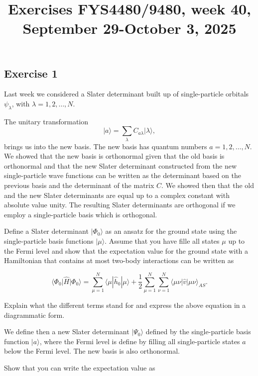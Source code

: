 \documentclass[prc]{revtex4}
\begin{document}
\title{Exercises FYS4480/9480, week 40, September 29-October 3, 2025}
\maketitle



\subsection*{Exercise 1}

Last week we considered a Slater determinant built up of
single-particle orbitals $\psi_{\lambda}$, with $\lambda =
1,2,\dots,N$.

The unitary transformation
\[
\vert a\rangle  = \sum_{\lambda} C_{a\lambda}\vert \lambda\rangle,
\]
brings us into the new basis.  The new basis has quantum numbers
$a=1,2,\dots,N$.  We showed that the new basis is orthonormal given
that the old basis is orthonormal and that the new Slater determinant
constructed from the new single-particle wave functions can be written
as the determinant based on the previous basis and the determinant of
the matrix $C$.  We showed then that the old and the new Slater
determinants are equal up to a complex constant with absolute value
unity.  The resulting Slater determinants are orthogonal if we employ
a single-particle basis which is orthogonal.

Define a Slater determinant $\vert\Phi_0\rangle$ as an ansatz for the ground state
using the single-particle basis functions $\vert\mu\rangle$.  Assume
that you have fille all states $\mu$ up to the Fermi level and show
that the expectation value for the ground state with a Hamiltonian
that contains at most two-body interactions can be written as

\[
 \langle \Phi_0 \vert \hat{H}\vert \Phi_0\rangle 
  = \sum_{\mu=1}^N \langle \mu | \hat{h}_0 | \mu \rangle +
  \frac{1}{2}\sum_{{\mu}=1}^N\sum_{{\nu}=1}^N \langle \mu\nu|\hat{v}|\mu\nu\rangle_{AS}.
\]

Explain what the different terms stand for and express the above
equation in a diagrammatic form.

We define then a new Slater determinant $\vert\Psi_0\rangle$ defined by the
single-particle basis function $\vert a\rangle$, where the Fermi level is
define by filling all single-particle states $a$ below the Fermi level. The new basis is also orthonormal.

Show that you can write the expectation value as
\end{document}
